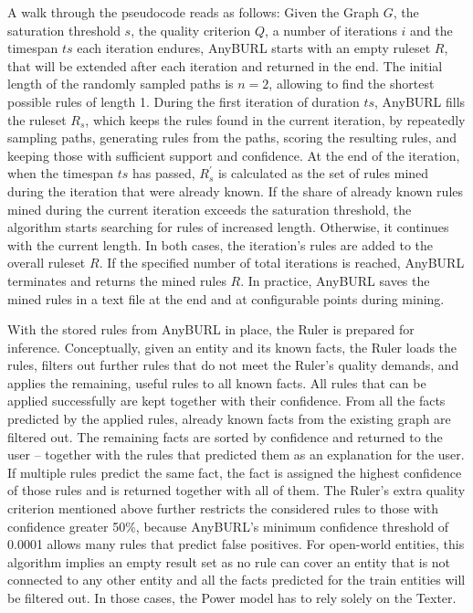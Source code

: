 A walk through the pseudocode reads as follows: Given the Graph $G$, the saturation threshold $s$, the quality criterion $Q$, a number of iterations $i$ and the timespan $ts$ each iteration endures, AnyBURL starts with an empty ruleset $R$, that will be extended after each iteration and returned in the end. The initial length of the randomly sampled paths is $n=2$, allowing to find the shortest possible rules of length 1. During the first iteration of duration $ts$, AnyBURL fills the ruleset $R_s$, which keeps the rules found in the current iteration, by repeatedly sampling paths, generating rules from the paths, scoring the resulting rules, and keeping those with sufficient support and confidence. At the end of the iteration, when the timespan $ts$ has passed, $R_s^{'}$ is calculated as the set of rules mined during the iteration that were already known. If the share of already known rules mined during the current iteration exceeds the saturation threshold, the algorithm starts searching for rules of increased length. Otherwise, it continues with the current length. In both cases, the iteration's rules are added to the overall ruleset $R$. If the specified number of total iterations is reached, AnyBURL terminates and returns the mined rules $R$. In practice, AnyBURL saves the mined rules in a text file at the end and at configurable points during mining.

With the stored rules from AnyBURL in place, the Ruler is prepared for inference. Conceptually, given an entity and its known facts, the Ruler loads the rules, filters out further rules that do not meet the Ruler's quality demands, and applies the remaining, useful rules to all known facts. All rules that can be applied successfully are kept together with their confidence. From all the facts predicted by the applied rules, already known facts from the existing graph are filtered out. The remaining facts are sorted by confidence and returned to the user -- together with the rules that predicted them as an explanation for the user. If multiple rules predict the same fact, the fact is assigned the highest confidence of those rules and is returned together with all of them. The Ruler's extra quality criterion mentioned above further restricts the considered rules to those with confidence greater 50\%, because AnyBURL's minimum confidence threshold of 0.0001 allows many rules that predict false positives. For open-world entities, this algorithm implies an empty result set as no rule can cover an entity that is not connected to any other entity and all the facts predicted for the train entities will be filtered out. In those cases, the Power model has to rely solely on the Texter.
